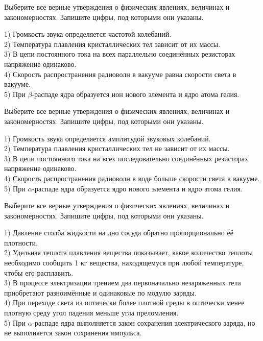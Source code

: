 \begin{taskbasic}[code={\label{task:kim18_img13}}]
Выберите все верные утверждения о физических явлениях, величинах и закономерностях. Запишите цифры, под которыми они указаны.

1) Громкость звука определяется частотой колебаний.\\
2) Температура плавления кристаллических тел зависит от их массы.\\
3) В цепи постоянного тока на всех параллельно соединённых резисторах напряжение одинаково.\\
4) Скорость распространения радиоволн в вакууме равна скорости света в вакууме.\\
5) При $\beta$-распаде ядра образуется ион нового элемента и ядро атома гелия.

\end{taskbasic}

\begin{taskbasic}[code={\label{task:kim18_img14}}]
Выберите все верные утверждения о физических явлениях, величинах и закономерностях. Запишите цифры, под которыми они указаны.

1) Громкость звука определяется амплитудой звуковых колебаний.\\
2) Температура плавления кристаллических тел не зависит от их массы.\\
3) В цепи постоянного тока на всех последовательно соединённых резисторах напряжение одинаково.\\
4) Скорость распространения радиоволн в воде больше скорости света в вакууме.\\
5) При $\alpha$-распаде ядра образуется ядро нового элемента и ядро атома гелия.

\end{taskbasic}

\begin{taskbasic}[code={\label{task:kim18_img15}}]
Выберите все верные утверждения о физических явлениях, величинах и закономерностях. Запишите цифры, под которыми они указаны.

1) Давление столба жидкости на дно сосуда обратно пропорционально её плотности.\\
2) Удельная теплота плавления вещества показывает, какое количество теплоты необходимо сообщить 1 кг вещества, находящемуся при любой температуре, чтобы его расплавить.\\
3) В процессе электризации трением два первоначально незаряженных тела приобретают разноимённые и одинаковые по модулю заряды.\\
4) При переходе света из оптически более плотной среды в оптически менее плотную среду угол падения меньше угла преломления.\\
5) При $\alpha$-распаде ядра выполняется закон сохранения электрического заряда, но не выполняется закон сохранения импульса.

\end{taskbasic}

